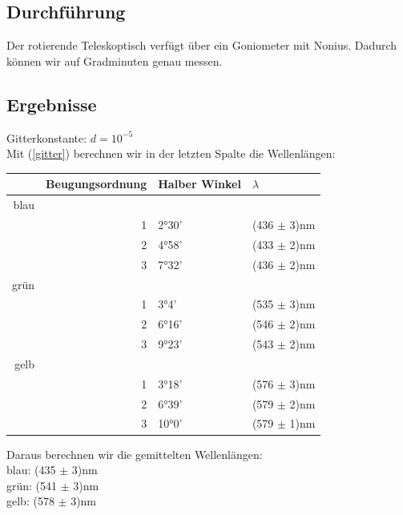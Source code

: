 \documentclass{article}
\begin{document}
\subsection{Durchführung}

Der rotierende Teleskoptisch verfügt über ein Goniometer mit Nonius. Dadurch können wir auf Gradminuten genau messen.

\subsection{Ergebnisse}
Gitterkonstante: $d=10^{-5}$\\
Mit (\ref{gitter}) berechnen wir in der letzten Spalte die Wellenlängen:
\begin{center}
\begin{tabular}{|r|r|l|l|}
\hline
& Beugungsordnung & Halber Winkel & $\lambda$\\
\hline
\hline
blau & & &\\
& 1 & 2°30' & (436 $\pm$ 3)nm\\
& 2 & 4°58' & (433 $\pm$ 2)nm\\
& 3 & 7°32' & (436 $\pm$ 2)nm\\
\hline
grün & & &\\
& 1 & 3°4' & (535 $\pm$ 3)nm\\
& 2 & 6°16' & (546 $\pm$ 2)nm\\
& 3 & 9°23' & (543 $\pm$ 2)nm\\
\hline
gelb & & &\\
& 1 & 3°18' & (576 $\pm$ 3)nm\\
& 2 & 6°39' & (579 $\pm$ 2)nm\\
& 3 & 10°0' & (579 $\pm$ 1)nm\\
\hline
\end{tabular}
\end{center}
\vspace{0.8cm}

Daraus berechnen wir die gemittelten Wellenlängen:\\
blau: (435 $\pm$ 3)nm\\
grün: (541 $\pm$ 3)nm\\
gelb: (578 $\pm$ 3)nm\\
\end{document}
